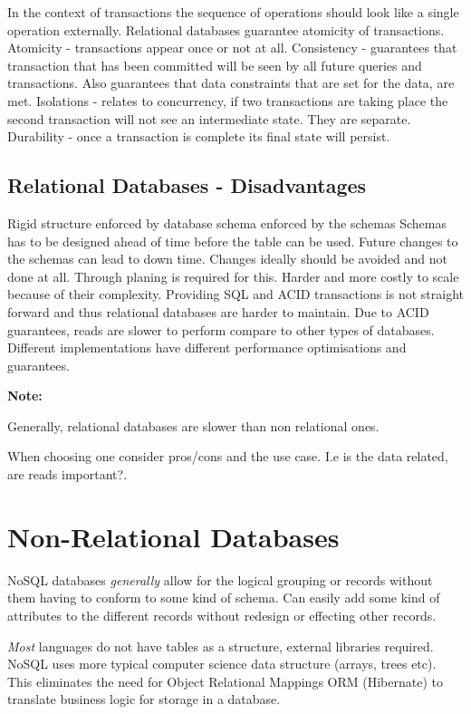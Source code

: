 \documentclass[a4paper, 11pt]{book}
\newenvironment{note}{
    \begin{siderule}
        \textbf{Note: }
        }{
    \end{siderule}}
\begin{document}
    In the context of transactions the sequence of operations should look like a single operation externally.
    Relational databases guarantee atomicity of transactions.
    Atomicity - transactions appear once or not at all.
    Consistency - guarantees that transaction that has been committed will be seen by all future queries and transactions.
    Also guarantees that data constraints that are set for the data, are met.
    Isolations - relates to concurrency, if two transactions are taking place the second transaction will not see an intermediate state. They are separate.
    Durability - once a transaction is complete its final state will persist.

    \subsection{Relational Databases - Disadvantages}
    Rigid structure enforced by database schema enforced by the schemas
    Schemas has to be designed ahead of time before the table can be used.
    Future changes to the schemas can lead to down time.
    Changes ideally should be avoided and not done at all.
    Through planing is required for this.
    Harder and more costly to scale because of their complexity.
    Providing SQL and ACID transactions is not straight forward and thus relational databases are harder to maintain.
    Due to ACID guarantees, reads are slower to perform compare to other types of databases.
    Different implementations have different performance optimisations and guarantees.

    \begin{note}
        Generally, relational databases are slower than non relational ones.
    \end{note}

    When choosing one consider pros/cons and the use case.
    I.e is the data related, are reads important?.


    \section{Non-Relational Databases}

    NoSQL databases \textit{generally} allow for the logical grouping or records without them having to conform to some kind of schema.
    Can easily add some kind of attributes to the different records without redesign or effecting other records.

    \textit{Most} languages do not have tables as a structure, external libraries required.
    NoSQL uses more typical computer science data structure (arrays, trees etc).
    This eliminates the need for Object Relational Mappings ORM (Hibernate) to translate business logic for storage in a database.
\end{document}
